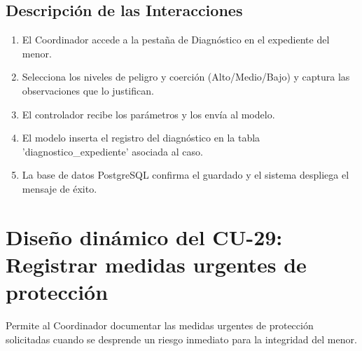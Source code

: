 \subsection{Descripción de las Interacciones}
\begin{enumerate}
    \item El Coordinador accede a la pestaña de Diagnóstico en el expediente del menor.
    \item Selecciona los niveles de peligro y coerción (Alto/Medio/Bajo) y captura las observaciones que lo justifican.
    \item El controlador recibe los parámetros y los envía al modelo.
    \item El modelo inserta el registro del diagnóstico en la tabla 'diagnostico\_expediente' asociada al caso.
    \item La base de datos PostgreSQL confirma el guardado y el sistema despliega el mensaje de éxito.
\end{enumerate}

\cleardoublepage
\section{Diseño dinámico del CU-29: Registrar medidas urgentes de protección}
\label{sec:disenoDinamicoCU29}

Permite al Coordinador documentar las medidas urgentes de protección solicitadas cuando se desprende un riesgo inmediato para la integridad del menor.

